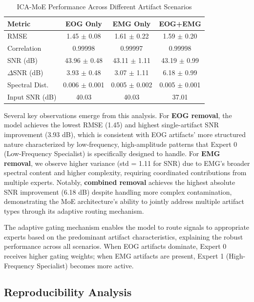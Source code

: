 \documentclass{article}
\begin{document}
\begin{table}[!t]
\centering
\caption{ICA-MoE Performance Across Different Artifact Scenarios}
\label{tab:scenario_results}
\begin{tabular}{lccc}
\toprule
\textbf{Metric} & \textbf{EOG Only} & \textbf{EMG Only} & \textbf{EOG+EMG} \\
\midrule
RMSE & 1.45 $\pm$ 0.08 & 1.61 $\pm$ 0.22 & 1.59 $\pm$ 0.20 \\
Correlation & 0.99998 & 0.99997 & 0.99998 \\
SNR (dB) & 43.96 $\pm$ 0.48 & 43.11 $\pm$ 1.11 & 43.19 $\pm$ 0.99 \\
$\Delta$SNR (dB) & 3.93 $\pm$ 0.48 & 3.07 $\pm$ 1.11 & 6.18 $\pm$ 0.99 \\
Spectral Dist. & 0.006 $\pm$ 0.001 & 0.005 $\pm$ 0.002 & 0.005 $\pm$ 0.001 \\
\midrule
Input SNR (dB) & 40.03 & 40.03 & 37.01 \\
\bottomrule
\end{tabular}
\end{table}

Several key observations emerge from this analysis. For \textbf{EOG removal}, the model achieves the lowest RMSE (1.45) and highest single-artifact SNR improvement (3.93 dB), which is consistent with EOG artifacts' more structured nature characterized by low-frequency, high-amplitude patterns that Expert 0 (Low-Frequency Specialist) is specifically designed to handle. For \textbf{EMG removal}, we observe higher variance (std = 1.11 for SNR) due to EMG's broader spectral content and higher complexity, requiring coordinated contributions from multiple experts. Notably, \textbf{combined removal} achieves the highest absolute SNR improvement (6.18 dB) despite handling more complex contamination, demonstrating the MoE architecture's ability to jointly address multiple artifact types through its adaptive routing mechanism.

The adaptive gating mechanism enables the model to route signals to appropriate experts based on the predominant artifact characteristics, explaining the robust performance across all scenarios. When EOG artifacts dominate, Expert 0 receives higher gating weights; when EMG artifacts are present, Expert 1 (High-Frequency Specialist) becomes more active.

\subsection{Reproducibility Analysis}
\end{document}
